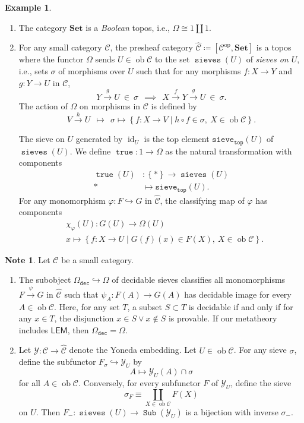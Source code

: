 \documentclass[10pt,letterpaper,cm]{nupset}
\theoremstyle{definition}
\newtheorem{exmp}[definition]{Example}
\newtheorem{note}[definition]{Note}
\theoremstyle{theorem}
\theoremstyle{remark}
\newcommand{\1}{\mathbf{1}}
\renewcommand{\c}{\mathscr{C}}
\newcommand{\y}{\mathcal{Y}}
\newcommand{\0}{\vec 0}
\DeclareMathOperator{\id}{id}
\DeclareMathOperator{\true}{\mathtt{true}}
\DeclareMathOperator{\sieves}{\mathtt{sieves}}
\DeclareMathOperator{\op}{op}
\DeclareMathOperator{\ob}{ob}
\DeclareMathOperator{\sub}{\mathtt{Sub}}
\newcommand{\be}{\begin{enumerate}}
\newcommand{\ee}{\end{enumerate}}
\begin{document}
\pagebreak

\begin{exmp} $ $
\be
\item The category $\mathbf{Set}$ is a \textit{Boolean} topos, i.e., $\Omega \cong 1 \coprod 1$. 
\item For any small category $\c$, the presheaf category $\widehat{\c} \coloneqq \left[ \c^{\op}, \mathbf{Set}\right]$ is a topos where the functor $\Omega$ sends $U \in \ob{\c}$ to the set $\sieves(U)$ of \textit{sieves on $U$}, i.e., sets $\sigma$ of morphisms over $U$ such that for any morphisms $f : X \to Y$ and $g : Y \to U$ in $\c$,
\[
Y \xrightarrow{g} U \  \in \ \sigma \ \ \implies \ \  X \xrightarrow{f} Y \xrightarrow{g} U \ \in \ \sigma 
.\] 
The action of $\Omega$ on morphisms in $\c$ is defined by
\[
V \xrightarrow{h} U  \ \  \mapsto \ \  \sigma \mapsto \left\{f : X \to V \mid h \circ f \in \sigma, \ X \in \ob{\c}    \right\}   
.\]

The sieve on $U$ generated by  $\id_U$ is the top element $\mathtt{sieve}_{\mathtt{top}}(U)$ of $\sieves(U)$. We define $\true : 1 \to \Omega$ as  the natural transformation with components
\begin{align*}
\true(U) & : \left\{\ast\right\} \to \sieves(U)
\\ \ast & \mapsto \mathtt{sieve}_{\mathtt{top}}(U).
\end{align*}
For any monomorphism $\varphi: F \hookrightarrow G$ in $\widehat{\c}$, the classifying map of $\varphi$ has components
\begin{align*}
& \chi_{\varphi}(U)  : G(U) \to \Omega(U)
\\ & x  \mapsto  \left\{f : X \to U \mid G(f)(x) \in  F(X),\ X \in \ob{\c}   \right\}.
\end{align*}
\ee
\end{exmp}

\begin{note} Let $\c$ be a small category.
\be
\item The subobject $\Omega_{\mathtt{dec}} \hookrightarrow \Omega$ of decidable sieves classifies all monomorphisms $F \xrightarrow{\psi} G$ in $\widehat{\c}$ such that $\psi_A : F(A) \to G(A)$ has decidable image for every $A \in \ob{\c}$. Here, for any set $T$, a subset $S \subset T$ is decidable if and only if for any $x \in T$, the disjunction $x \in S \vee x \notin S$ is provable. If our metatheory includes $\mathsf{LEM}$, then $\Omega_{\mathtt{dec}} = \Omega$.
\item  Let $\y : \c \to \widehat{\c}$ denote the Yoneda embedding.
Let $U \in \ob{\c}$. For any sieve $\sigma$, define the subfunctor $F_{\sigma} \hookrightarrow \y_{U}$ by 
\[
A  \mapsto  \y_U(A) \cap \sigma
\] for  all $A \in \ob{\c}$. Conversely, for every subfunctor $F$ of $\y_U$, define the sieve 
\[
\sigma_F \equiv \coprod_{X \in \ob{\c}}F(X)
\] on $U$. Then $F_{-} : \sieves(U) \to \sub(\y_U)$ is a bijection with inverse $\sigma_{-}$.
\ee
\end{note}
\end{document}
